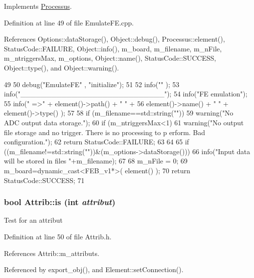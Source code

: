 Implements \hyperlink{classProcessus_aee88ad7b77ae7319cf8b128e9dd2ea11}{Processus}.

Definition at line 49 of file EmulateFE.cpp.

References Options::dataStorage(), Object::debug(), Processus::element(), StatusCode::FAILURE, Object::info(), m\_\-board, m\_\-filename, m\_\-nFile, m\_\-ntriggersMax, m\_\-options, Object::name(), StatusCode::SUCCESS, Object::type(), and Object::warning().


\begin{DoxyCode}
49                                    {
50   debug("EmulateFE" , "initialize");
51 
52   info("" );
53   info("____________________________");
54   info("FE emulation");
55   info(" =>" + element()->path() + " " +
56       element()->name() + " " + element()->type() );
57 
58   if (m_filename==std::string("")){
59     warning("No ADC output data storage.");
60     if (m_ntriggersMax<1){
61       warning("No output file storage and no trigger. There is no processing to p
      erform. Bad configuration.");
62       return StatusCode::FAILURE;
63     }
64   }
65   if ((m_filename!=std::string(""))&(m_options->dataStorage())){
66     info("Input data will be stored in files "+m_filename);
67   }
68   m_nFile = 0;
69   m_board=dynamic_cast<FEB_v1*>( element() );
70   return StatusCode::SUCCESS;
71 }
\end{DoxyCode}
\hypertarget{classAttrib_a704f26af560909ad22065083bb7d4c34}{
\subsubsection[{is}]{\setlength{\rightskip}{0pt plus 5cm}bool Attrib::is (int {\em attribut})}}
\label{classAttrib_a704f26af560909ad22065083bb7d4c34}
Test for an attribut 

Definition at line 50 of file Attrib.h.

References Attrib::m\_\-attributs.

Referenced by export\_\-obj(), and Element::setConnection().


